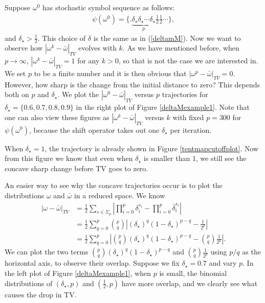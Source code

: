 \begin{example}
\label{example:constantoega0}
Suppose $\omega^0$ has stochastic symbol sequence as follows:
  \begin{eqnarray}
  \label{constantomega0}
   \psi(\omega^0) =  \{.\underbrace{\delta_\star \delta_\star \cdots \delta_\star}_{p}\frac{1}{2}\frac{1}{2}\cdots\},
  \end{eqnarray}
and $\delta_\star >\frac{1}{2}$. This choice of $\delta$ is the same as in (\ref{deltamM}). Now we want to observe how $|\omega^k-\bar{\omega} |_{TV}$ evolves with $k$. As we have mentioned before, when $p \to \infty$, $|\omega^k-\bar{\omega}|_{TV} = 1$ for any $k>0$, so that is not the case we are interested in. We set $p$ to be a finite number and it is then obvious that $|\omega^p-\bar{\omega}|_{TV} = 0$. However, how sharp is the change from the initial distance to zero? This depends both on $p$ and $\delta_\star$. We plot the $|\omega^0-\bar{\omega} |_{TV}$ versus $p$ trajectories for $\delta_\star=\{0.6, 0.7,0.8,0.9\}$ in the right plot of Figure \ref{deltaMexample1}. Note that one can also view these figures as $|\omega^k-\bar{\omega}|_{TV}$ versus $k$ with fixed $p=300$ for $\psi(\omega^0)$, because the shift operator takes out one $\delta_\star$ per iteration.

When $\delta_\star=1$, the trajectory is already shown in Figure \ref{tentmapcutoffplot}. Now from this figure we know that even when $\delta_\star$ is smaller than $1$, we still see the concave sharp change before TV goes to zero. 

An easier way to see why the concave trajectories occur is to plot the distributions $\omega$ and $\bar{\omega}$ in a reduced space. We know
 \begin{align}
  |\omega-\bar{\omega}|_{TV}
       &= \frac{1}{2} \sum_{s\in\Sigma_{p}}
         \left| \prod_{i=0}^p\delta_i^{s_i}-\prod_{i=0}^p\bar{\delta}_i^{s_i}  \right| \nonumber\\
       &= \frac{1}{2}  \sum_{q=0}^p
          {p \choose q} \left|(\delta_\star)^q (1-\delta_\star)^{p-q} - \frac{1}{2^p} \right| \nonumber \\
       &=  \frac{1}{2}  \sum_{q=0}^p \left|{p \choose q} (\delta_\star)^q (1-\delta_\star)^{p-q} -{p \choose q} \frac{1}{2^p} \right|.
 \end{align}
We can plot the two terms ${p \choose q} (\delta_\star)^q (1-\delta_\star)^{p-q}$ and ${p \choose q} \frac{1}{2^p}$ using $p/q$ as the horizontal axis, to observe their overlap. Suppose we fix $\delta_\star = 0.7$ and vary $p$. In the left plot of Figure \ref{deltaMexample1}, when $p$ is small, the binomial distributions of $(\delta_\star,p)$ and $(\frac{1}{2},p)$ have more overlap, and we clearly see what causes the drop in TV.


\end{example}
